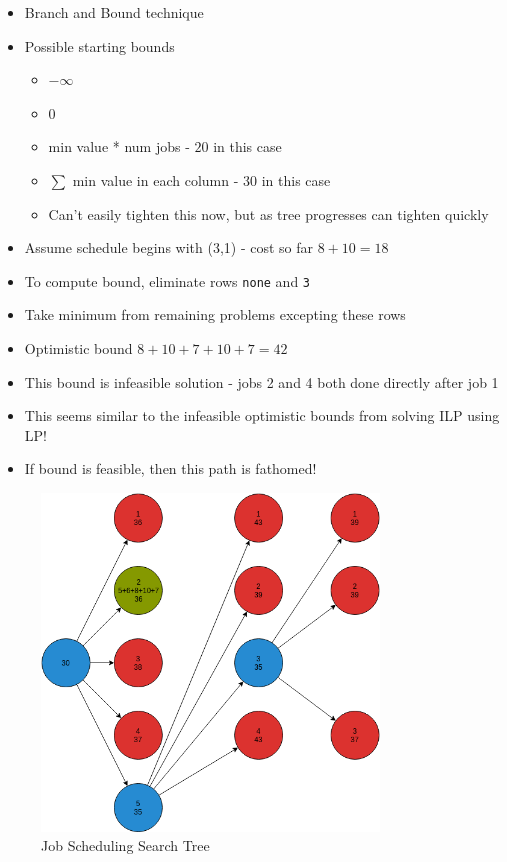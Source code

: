 \documentclass[12pt, letter]{article}
\begin{document}
\begin{itemize}
	\item Branch and Bound technique
	\item Possible starting bounds
	\begin{itemize}
		\item $-\infty$
		\item 0
		\item min value * num jobs - $20$ in this case
		\item $\sum$ min value in each column - $30$ in this case
		\item Can't easily tighten this now, but as tree progresses can tighten quickly
	\end{itemize}
	\item Assume schedule begins with (3,1) - cost so far $8 + 10 = 18$
	\item To compute bound, eliminate rows \texttt{none} and \texttt{3} 
	\item Take minimum from remaining problems excepting these rows
	\item Optimistic bound $8 + 10 + 7 + 10 + 7 = 42$
	\item This bound is infeasible solution - jobs 2 and 4 both done directly after job 1
	\item This seems similar to the infeasible optimistic bounds from solving ILP using LP!
	\item If bound is feasible, then this path is fathomed!
\end{itemize}

\begin{figure}[h]
	\centering
	\includegraphics[width=0.8\textwidth]{jobsched}
	\caption{Job Scheduling Search Tree}
	\label{fig:jobsched}
\end{figure}
\end{document}
